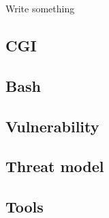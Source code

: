 Write something
\subsection*{CGI}
\subsection*{Bash}
\subsection*{Vulnerability}

\subsection*{Threat model}
\subsection*{Tools}